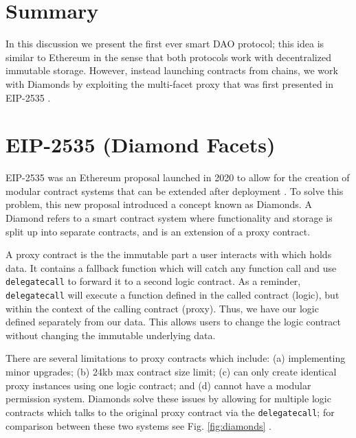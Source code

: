 \documentclass[journal,twocolumn,12pt]{ieeesyscoin}
\begin{document}
\section{Summary}
\label{section:summary}

In this discussion we present the first ever smart DAO protocol; this idea is similar to Ethereum in the sense that both protocols work with decentralized immutable storage. However, instead launching contracts from chains, we work with Diamonds by exploiting the multi-facet proxy that was first presented in EIP-2535 \cite{Mud20}.

\appendices

\section{EIP-2535 (Diamond Facets)}
\label{sec:diamond}

EIP-2535 was an Ethereum proposal launched in 2020 to allow for the creation of modular contract systems that can be extended after deployment \cite{Mud20}. To solve this problem, this new proposal introduced a concept known as Diamonds. A Diamond refers to a smart contract system where functionality and storage is split up into separate contracts, and is an extension of a proxy contract.

A proxy contract is the the immutable part a user interacts with which holds data. It contains a fallback function which will catch any function call and use \texttt{delegatecall} to forward it to a second logic contract. As a reminder, \texttt{delegatecall} will execute a function defined in the called contract (logic), but within the context of the calling contract (proxy). Thus, we have our logic defined separately from our data. This allows users to change the logic contract without changing the immutable underlying data. 

There are several limitations to proxy contracts which include: (a) implementing minor upgrades; (b) 24kb max contract size limit; (c) can only create identical proxy instances using one logic contract; and (d) cannot have a modular permission system. Diamonds solve these issues by allowing for multiple logic contracts which talks to the original proxy contract via the \texttt{delegatecall}; for comparison between these two systems see Fig. \ref{fig:diamonds} .
\end{document}
